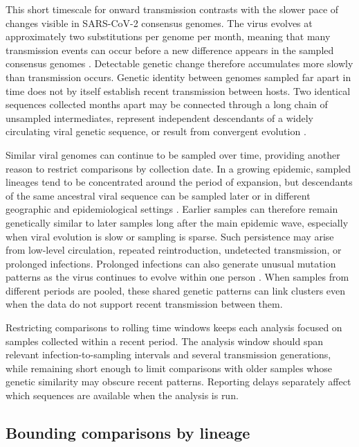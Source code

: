 This short timescale for onward transmission contrasts with the slower pace of changes visible in SARS-CoV-2 consensus genomes. The virus evolves at approximately two substitutions per genome per month, meaning that many transmission events can occur before a new difference appears in the sampled consensus genomes \citep{Duchene2020,Pybus2013}. Detectable genetic change therefore accumulates more slowly than transmission occurs. Genetic identity between genomes sampled far apart in time does not by itself establish recent transmission between hosts. Two identical sequences collected months apart may be connected through a long chain of unsampled intermediates, represent independent descendants of a widely circulating viral genetic sequence, or result from convergent evolution \citep{Martin2021}.

Similar viral genomes can continue to be sampled over time, providing another reason to restrict comparisons by collection date. In a growing epidemic, sampled lineages tend to be concentrated around the period of expansion, but descendants of the same ancestral viral sequence can be sampled later or in different geographic and epidemiological settings \citep{Volz2009,Volz2013}. Earlier samples can therefore remain genetically similar to later samples long after the main epidemic wave, especially when viral evolution is slow or sampling is sparse. Such persistence may arise from low-level circulation, repeated reintroduction, undetected transmission, or prolonged infections. Prolonged infections can also generate unusual mutation patterns as the virus continues to evolve within one person \citep{Choi2020,Kemp2021}. When samples from different periods are pooled, these shared genetic patterns can link clusters even when the data do not support recent transmission between them.

Restricting comparisons to rolling time windows keeps each analysis focused on samples collected within a recent period. The analysis window should span relevant infection-to-sampling intervals and several transmission generations, while remaining short enough to limit comparisons with older samples whose genetic similarity may obscure recent patterns. Reporting delays separately affect which sequences are available when the analysis is run.

\subsection{Bounding comparisons by lineage}\label{sec:ch2_co_circulating_subepidemics}

